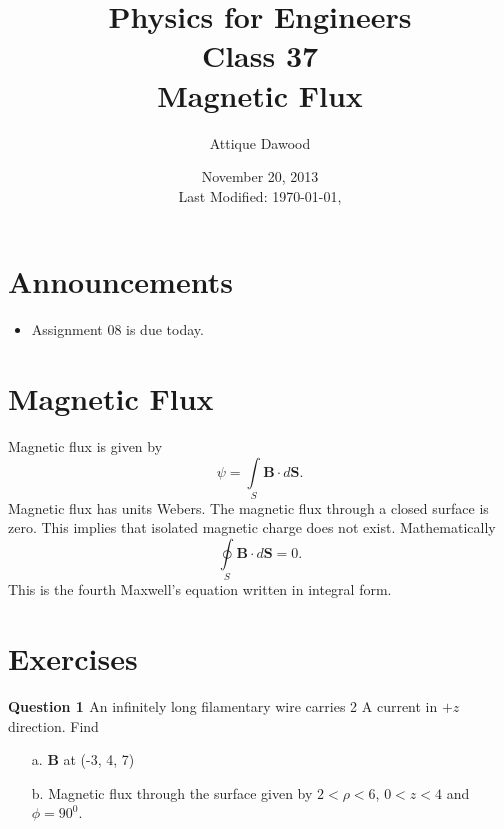 \documentclass[12pt,a4paper]{article}
\title{\vspace{-3cm}Physics for Engineers\\Class 37\\Magnetic Flux}
\author{Attique Dawood}
\date{November 20, 2013\\[0.2cm] Last Modified: \today, \currenttime}
\begin{document}
\maketitle
\section{Announcements}
\begin{itemize}
\item Assignment 08 is due today.
\end{itemize}
\section{Magnetic Flux}
Magnetic flux is given by
\begin{equation}
\psi=\int\limits_{S}\textbf{B}\cdot d{\textbf{S}}.
\end{equation}
Magnetic flux has units Webers. The magnetic flux through a closed surface is zero. This implies that isolated magnetic charge does not exist. Mathematically
\begin{equation}
\oint\limits_{S}\textbf{B}\cdot d{\textbf{S}}=0.
\end{equation}
This is the fourth Maxwell's equation written in integral form.
\section{Exercises}
\noindent\textbf{Question 1 \cite[Problem 7.21, page 300]{Sadiku}} An infinitely long filamentary wire carries 2 A current in $+z$ direction. Find
\begin{itemize}
\item[a.] \textbf{B} at (-3, 4, 7)
\item[b.] Magnetic flux through the surface given by $2<\rho<6$, $0<z<4$ and $\phi=90^0$.
\end{itemize}


\end{document}
